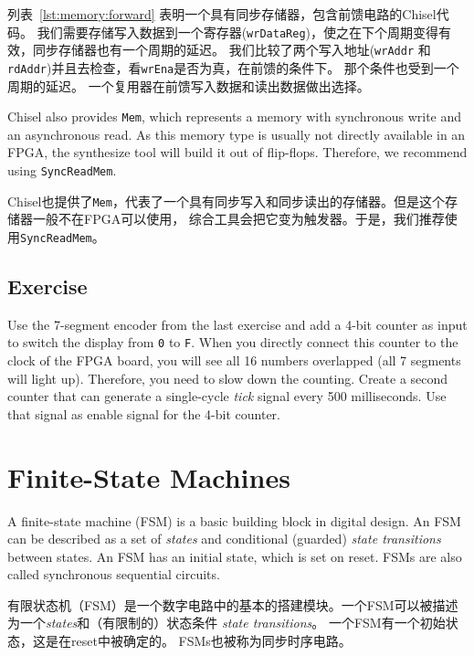 \documentclass[%
    10pt,
    headinclude, footexclude,
    openright, %
    notitlepage,
    cleardoubleempty,
    headsepline,
    pointlessnumbers,
    bibtotoc, idxtotoc,
    ]{scrbook}
\newcommand{\code}[1]{{\small{\texttt{#1}}}}
\newcommand{\todo}[1]{{\emph{TODO: #1}}}
\renewcommand{\todo}[1]{}
\begin{document}
列表~\ref{lst:memory:forward} 表明一个具有同步存储器，包含前馈电路的Chisel代码。
我们需要存储写入数据到一个寄存器(\code{wrDataReg})，使之在下个周期变得有效，同步存储器也有一个周期的延迟。
我们比较了两个写入地址(\code{wrAddr} 和 \code{rdAddr})并且去检查，看\code{wrEna}是否为真，在前馈的条件下。
那个条件也受到一个周期的延迟。
一个复用器在前馈写入数据和读出数据做出选择。


Chisel also provides \code{Mem}, which represents a memory with synchronous
write and an asynchronous read. As this memory type is usually not directly available
in an FPGA, the synthesize tool will build it out of flip-flops.
Therefore, we recommend using \code{SyncReadMem}.

Chisel也提供了\code{Mem}，代表了一个具有同步写入和同步读出的存储器。但是这个存储器一般不在FPGA可以使用，
综合工具会把它变为触发器。于是，我们推荐使用\code{SyncReadMem}。

\section{Exercise}

Use the 7-segment encoder from the last exercise and add a 4-bit counter as input
to switch the display from \code{0} to \code{F}. When you directly connect this
counter to the clock of the FPGA board, you will see all 16 numbers
overlapped (all 7 segments will light up).
Therefore, you need to slow down the counting. Create a second
counter that can generate a single-cycle \emph{tick} signal every 500 milliseconds.
Use that signal as enable signal for the 4-bit counter.

\todo{Luca: More exercises would be nice. Maybe in the future?}

\chapter{Finite-State Machines}

A finite-state machine (FSM) is a basic building block in digital design.
An FSM can be described as a set of \emph{states} and conditional (guarded)
\emph{state transitions} between states. 
An FSM has an initial state, which is set on reset.
FSMs are also called synchronous sequential circuits.

有限状态机（FSM）是一个数字电路中的基本的搭建模块。一个FSM可以被描述为一个\emph{states}和（有限制的）状态条件
\emph{state transitions}。
一个FSM有一个初始状态，这是在reset中被确定的。
FSMs也被称为同步时序电路。
\end{document}
